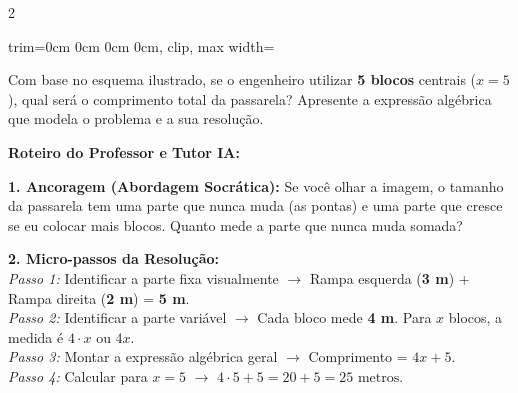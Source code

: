 \begin{multicols*}{2}
\begin{enunciadoLiteral}
\begin{center}
\begin{adjustbox}{trim=0cm 0cm 0cm 0cm, clip, max width=\larguraTikz}
\end{adjustbox}
\end{center}

Com base no esquema ilustrado, se o engenheiro utilizar \textbf{5 blocos} centrais ($x=5$), qual será o comprimento total da passarela? Apresente a expressão algébrica que modela o problema e a sua resolução.
\end{enunciadoLiteral}

\ifgabarito
    \begin{tcolorbox}[colback=CorTitUm!5, colframe=CorTitUm, boxrule=1pt, arc=4pt, left=6pt, right=6pt, top=6pt, bottom=6pt]
    \small\textbf{\textcolor{CorTitUm}{Roteiro do Professor e Tutor IA:}}\par\vspace{0.1cm}
    \color{CinzaEscuro}
    \textbf{1. Ancoragem (Abordagem Socrática):} Se você olhar a imagem, o tamanho da passarela tem uma parte que nunca muda (as pontas) e uma parte que cresce se eu colocar mais blocos. Quanto mede a parte que nunca muda somada?\par\vspace{0.1cm}
    
    \textbf{2. Micro-passos da Resolução:}\\
    \textit{Passo 1:} Identificar a parte fixa visualmente $\rightarrow$ Rampa esquerda (\textbf{3 m}) + Rampa direita (\textbf{2 m}) = \textbf{5 m}.\\
    \textit{Passo 2:} Identificar a parte variável $\rightarrow$ Cada bloco mede \textbf{4 m}. Para $x$ blocos, a medida é $4 \cdot x$ ou $4x$.\\
    \textit{Passo 3:} Montar a expressão algébrica geral $\rightarrow$ Comprimento = $ 4x + 5 $.\\
    \textit{Passo 4:} Calcular para $x=5$ $\rightarrow$ $ 4 \cdot 5 + 5 = 20 + 5 = 25 \text{ metros}. $\par\vspace{0.1cm}
    

\end{tcolorbox}
\end{multicols*}
